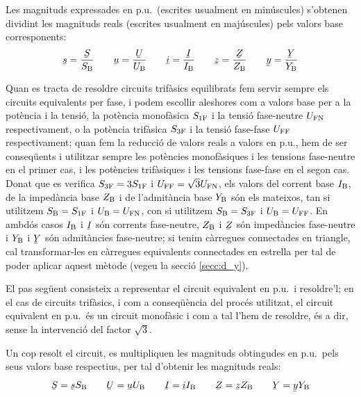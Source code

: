 Les magnituds expressades en p.u.\ (escrites usualment en min\'{u}scules) s'obtenen
dividint les magnituds reals (escrites usualment en maj\'{u}scules) pels valors base corresponents:
\begin{equation}
   \cmplx{s} = \frac{\cmplx{S}}{S\ped{B}} \qquad \cmplx{u} = \frac{\cmplx{U}}{U\ped{B}} \qquad \cmplx{i} = \frac{\cmplx{I}}{I\ped{B}} \qquad \cmplx{z} = \frac{\cmplx{Z}}{Z\ped{B}} \qquad \cmplx{y} = \frac{\cmplx{Y}}{Y\ped{B}}
\end{equation}

Quan es tracta de resoldre circuits trif\`{a}sics equilibrats fem servir sempre els circuits equivalents per fase, i podem escollir aleshores com a valors base per a la pot\`{e}ncia i la tensi\'{o}, la pot\`{e}ncia monof\`{a}sica $S_\mathrm{1F}$ i la tensi\'{o} fase-neutre $U_\mathrm{FN}$ respectivament, o la pot\`{e}ncia trif\`{a}sica $S_\mathrm{3F}$ i la tensi\'{o} fase-fase $U_\mathrm{FF}$ respectivament; quan fem la reducci\'{o} de valors reals a valors en p.u., hem de ser conseq\"{u}ents i utilitzar sempre les pot\`{e}ncies monof\`{a}siques i les tensions fase-neutre en el primer cas, i les pot\`{e}ncies trif\`{a}siques i les tensions fase-fase en el segon cas. Donat que es verifica $S_\mathrm{3F}=3 S_\mathrm{1F}$ i $U_\mathrm{FF}=\sqrt{3}U_\mathrm{FN}$, els valors  del corrent base $I_\mathrm{B}$, de la imped\`{a}ncia base $Z_\mathrm{B}$ i  de l'admit\`{a}ncia base $Y_\mathrm{B}$ s\'{o}n els mateixos, tan si utilitzem $S_\mathrm{B}=S_\mathrm{1F}$ i $U_\mathrm{B}=U_\mathrm{FN}$, con si utilitzem $S_\mathrm{B}=S_\mathrm{3F}$ i $U_\mathrm{B}=U_\mathrm{FF}$. En ambd\'{o}s casos $I_\mathrm{B}$ i $\cmplx{I}$ s\'{o}n corrents fase-neutre, $Z_\mathrm{B}$ i $\cmplx{Z}$ s\'{o}n imped\`{a}ncies fase-neutre i $Y_\mathrm{B}$ i $\cmplx{Y}$ s\'{o}n admit\`{a}ncies fase-neutre; si tenim c\`{a}rregues connectades en triangle, cal transformar-les en c\`{a}rregues equivalents connectades en estrella per tal de poder aplicar aquest m\`{e}tode (vegeu la secci\'{o} \ref{secc:d_y}).

El pas seg\"{u}ent consisteix a representar el circuit equivalent en
p.u.\ i resoldre'l; en el cas de circuits trif\`{a}sics, i com a conseq\"{u}\`{e}ncia del proc\'{e}s utilitzat, el circuit equivalent en p.u.\ \'{e}s un circuit monof\`{a}sic i com a tal l'hem de resoldre, \'{e}s a dir, sense la intervenci\'{o} del factor $\sqrt{3}$.

Un cop resolt el circuit, es multipliquen les magnituds obtingudes en p.u.\ pels
seus valors base respectius, per tal d'obtenir les magnituds reals:
\begin{equation}
   \cmplx{S} = \cmplx{s} S\ped{B} \qquad \cmplx{U} = \cmplx{u} U\ped{B} \qquad \cmplx{I} = \cmplx{i} I\ped{B} \qquad \cmplx{Z} = \cmplx{z} Z\ped{B} \qquad \cmplx{Y} = \cmplx{y} Y\ped{B}
\end{equation}

